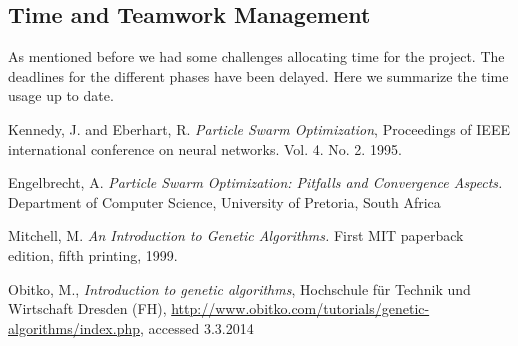 \documentclass[twoside]{article}
\begin{document}
\begin{multicols}{2}
\section{Time and Teamwork Management}
As mentioned before we had some challenges allocating time for the project. The deadlines for the different phases have been delayed. Here we summarize the time usage up to date.



\begin{thebibliography}{99} %
 Kennedy, J. and Eberhart, R.
  \emph{Particle Swarm Optimization},
 Proceedings of IEEE international conference on neural networks. Vol. 4. No. 2. 1995. 

 Engelbrecht, A. \emph{Particle Swarm Optimization: Pitfalls and Convergence Aspects.}
 Department of Computer Science, University of Pretoria, South Africa
 
Mitchell, M. \emph{An Introduction to Genetic Algorithms.} First MIT paperback edition, fifth printing, 1999. 
 
Obitko, M., \emph{Introduction to genetic algorithms}, Hochschule f\"ur Technik und Wirtschaft Dresden (FH), \url{http://www.obitko.com/tutorials/genetic-algorithms/index.php}, accessed 3.3.2014

\end{thebibliography}


\end{multicols}
\end{document}
